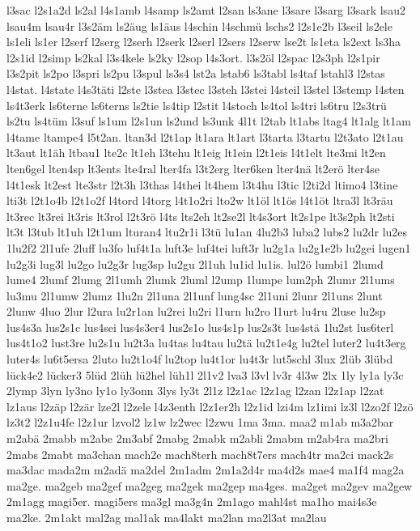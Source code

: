 {l3sac
l2s1a2d
ls2al
l4s1amb
l4samp
ls2amt
l2san
ls3ane
l3sare
l3sarg
l3sark
lsau2
lsau4m
lsau4r
l3s2äm
ls2äug
ls1äus
l4schin
l4schmü
lschs2
l2s1e2b
l3seil
ls2ele
ls1eli
ls1er
l2serf
l2serg
l2serh
l2serk
l2serl
l2sers
l2serw
lse2t
ls1eta
ls2ext
ls3ha
l2s1id
l2simp
ls2kal
l3s4kele
ls2ky
l2sop
l4s3ort.
l3s2öl
l2spac
l2s3ph
l2s1pir
l3s2pit
ls2po
l3spri
ls2pu
l3spul
ls3s4
lst2a
lstab6
ls3tabl
ls4taf
lstahl3
l2stas
l4stat.
l4state
l4s3täti
l2ste
l3stea
l3stec
l3steh
l3stei
l4steil
l3stel
l3stemp
l4sten
ls4t3erk
ls6terne
ls6terns
ls2tie
ls4tip
l2stit
l4stoch
ls4tol
ls4tri
ls6tru
l2s3trü
ls2tu
ls4tüm
l3suf
ls1um
l2s1un
ls2und
ls3unk
4l1t
l2tab
lt1abs
ltag4
lt1alg
lt1am
l4tame
ltampe4
l5t2an.
ltan3d
l2t1ap
lt1ara
lt1art
l3tarta
l3tartu
l2t3ato
l2t1au
lt3aut
lt1äh
ltbau1
lte2c
lt1eh
l3tehu
lt1eig
lt1ein
l2t1eis
l4t1elt
lte3mi
lt2en
lten6gel
lten4sp
lt3ents
lte4ral
lter4fa
l3t2erg
lter6ken
lter4nä
lt2erö
lter4se
l4t1esk
lt2est
lte3str
l2t3h
l3thas
l4thei
lt4hem
l3t4hu
l3tic
l2ti2d
ltimo4
l3tine
lti3t
l2t1o4b
l2t1o2f
l4tord
l4torg
l4t1o2ri
lto2w
lt1öl
lt1ös
l4t1öt
ltra3l
lt3räu
lt3rec
lt3rei
lt3ris
lt3rol
l2t3rö
l4ts
lts2eh
lt2se2l
lt4s3ort
lt2s1pe
lt3s2ph
lt2sti
lt3t
l3tub
lt1uh
l2t1um
lturan4
ltu2r1i
l3tü
lu1an
4lu2b3
luba2
lubs2
lu2dr
lu2es
1lu2f2
2l1ufe
2luff
lu3fo
luf4t1a
luft3e
luf4tei
luft3r
lu2g1a
lu2g1e2b
lu2gei
lugen1
lu2g3i
lug3l
lu2go
lu2g3r
lug3sp
lu2gu
2l1uh
lu1id
lu1is.
lul2ö
lumbi1
2lumd
lume4
2lumf
2lumg
2l1umh
2lumk
2luml
l2ump
1lumpe
lum2ph
2lumr
2l1ums
lu3mu
2l1umw
2lumz
1lu2n
2l1una
2l1unf
lung4sc
2l1uni
2lunr
2l1uns
2lunt
2lunw
4luo
2lur
l2ura
lu2r1an
lu2rei
lu2ri
l1urn
lu2ro
l1urt
lu4ru
2luse
lu2sp
lus4s3a
lus2s1c
lus4sei
lus4s3er4
lus2s1o
lus4s1p
lus2s3t
lus4stä
1lu2st
lus6terl
lus4t1o2
lust3re
lu2s1u
lu2t3a
lu4tas
lu4tau
lu2tä
lu2t1e4g
lu2tel
luter2
lu4t3erg
luter4s
lu6t5ersa
2luto
lu2t1o4f
lu2top
lu4t1or
lu4t3r
lut5schl
3lux
2lüb
3lübd
lück4e2
lücker3
5lüd
2lüh
lü2hel
lüh1l
2l1v2
lva3
l3vl
lv3r
4l3w
2lx
1ly
ly1a
ly3c
2lymp
3lyn
ly3no
ly1o
ly3onn
3lys
ly3t
2l1z
l2z1ac
l2z1ag
l2zan
l2z1ap
l2zat
lz1aus
l2zäp
l2zär
lze2l
l2zele
l4z3enth
l2z1er2h
l2z1id
lzi4m
lz1imi
lz3l
l2zo2f
l2zö
lz3t2
l2z1u4fe
l2z1ur
lzvol2
lz1w
lz2wec
l2zwu
1ma
3ma.
maa2
m1ab
m3a2bar
m2abä
2mabb
m2abe
2m3abf
2mabg
2mabk
m2abli
2mabm
m2ab4ra
ma2bri
2mabs
2mabt
ma3chan
mach2e
mach8terh
mach8t7ers
mach4tr
ma2ci
mack2s
ma3dac
mada2m
m2adä
ma2del
2m1adm
2m1a2d4r
ma4d2s
mae4
ma1f4
mag2a
ma2ge.
ma2geb
ma2gef
ma2geg
ma2gek
ma2gep
ma4ges.
ma2get
ma2gev
ma2gew
2m1agg
magi5er.
magi5ers
ma3gl
ma3g4n
2m1ago
mahl4st
ma1ho
mai4s3e
ma2ke.
2m1akt
mal2ag
mal1ak
ma4lakt
ma2lan
ma2l3at
ma2lau
}
